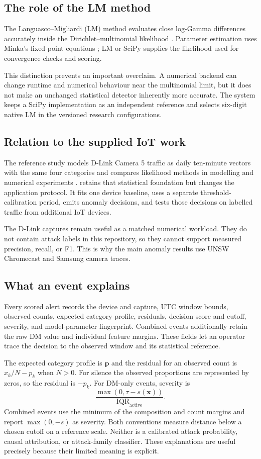 \subsection{The role of the LM method}

The Languasco--Migliardi (LM) method evaluates close log-Gamma differences
accurately inside the Dirichlet--multinomial likelihood \cite{lmcore,tpami}.
Parameter estimation uses Minka's
fixed-point equations \cite{minka}; LM or SciPy supplies the likelihood used for
convergence checks and scoring.

This distinction prevents an important overclaim. A numerical backend can change
runtime and numerical behaviour near the multinomial limit, but it does not make
an unchanged statistical detector inherently more accurate. The system keeps a
SciPy implementation as an independent reference and selects six-digit native LM
in the versioned research configurations.

\subsection{Relation to the supplied IoT work}

The reference study models D-Link Camera 5 traffic as daily ten-minute vectors
with the same four categories and compares likelihood methods in modelling and
numerical experiments \cite{iotpaper}. \projectname{} retains that statistical
foundation but changes the application protocol. It fits one device baseline,
uses a separate threshold-calibration period, emits anomaly decisions, and tests
those decisions on labelled traffic from additional IoT devices.

The D-Link captures remain useful as a matched numerical workload. They do not
contain attack labels in this repository, so they cannot support measured
precision, recall, or F1. This is why the main anomaly results use UNSW Chromecast
and Samsung camera traces.

\subsection{What an event explains}

Every scored alert records the device and capture, UTC window bounds, observed
counts, expected category profile, residuals, decision score and cutoff,
severity, and model-parameter fingerprint. Combined events additionally retain
the raw DM value and individual feature margins. These fields let an operator
trace the decision to the observed window and its statistical reference.

The expected category profile is $\boldsymbol{p}$ and the residual for an
observed count is $x_k/N-p_k$ when $N>0$. For silence the observed proportions
are represented by zeros, so the residual is $-p_k$. For DM-only events, severity is
\[
\frac{\max(0,\tau-s(\mathbf{x}))}{\mathrm{IQR}_{\mathrm{active}}}.
\]
Combined events use the minimum of the composition and count margins and
report $\max(0,-s)$ as severity. Both conventions measure distance below a chosen
cutoff on a reference scale. Neither is a calibrated attack probability,
causal attribution, or attack-family classifier. These explanations are useful precisely because
their limited meaning is explicit.
